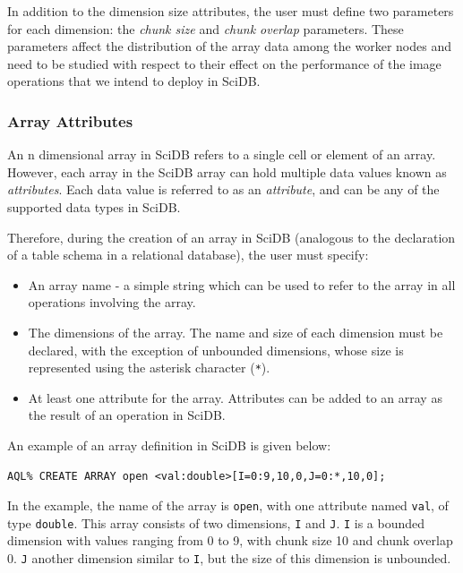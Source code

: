 \documentclass[letterpaper,twocolumn,10pt]{article}
\begin{document}
In addition to the dimension size attributes, the user must define two parameters for each dimension: the {\em chunk size} and {\em chunk overlap} parameters. These parameters affect the distribution of the array data among the worker nodes and need to be studied with respect to their effect on the performance of the image operations that we intend to deploy in SciDB.

\subsubsection{Array Attributes}
An n dimensional array in SciDB refers to a single cell or element of an array. However, each array in the SciDB array can hold multiple data values known as {\em attributes}. Each data value is referred to as an {\em attribute}, and can be any of the supported data types in SciDB.

Therefore, during the creation of an array in SciDB (analogous to the declaration of a table schema in a relational database), the user must specify:

\begin{itemize}
\item An array name - a simple string which can be used to refer to the array in all operations involving the array.
\item The dimensions of the array. The name and size of each dimension must be declared, with the exception of unbounded dimensions, whose size is represented using the asterisk character (\texttt{*}).
\item At least one attribute for the array. Attributes can be added to an array as the result of an operation in SciDB.
\end{itemize}

An example of an array definition in SciDB is given below:

\begin{lstlisting}[caption=Creating an Array in SciDB, frame=single]
AQL% CREATE ARRAY open <val:double>[I=0:9,10,0,J=0:*,10,0];
\end{lstlisting}

In the example, the name of the array is \texttt{open}, with one attribute named \texttt{val}, of type \texttt{double}. This array consists of two dimensions, \texttt{I} and \texttt{J}. \texttt{I} is a bounded dimension with values ranging from 0 to 9, with chunk size 10 and chunk overlap 0. \texttt{J} another dimension similar to \texttt{I}, but the size of this dimension is unbounded.
\end{document}
